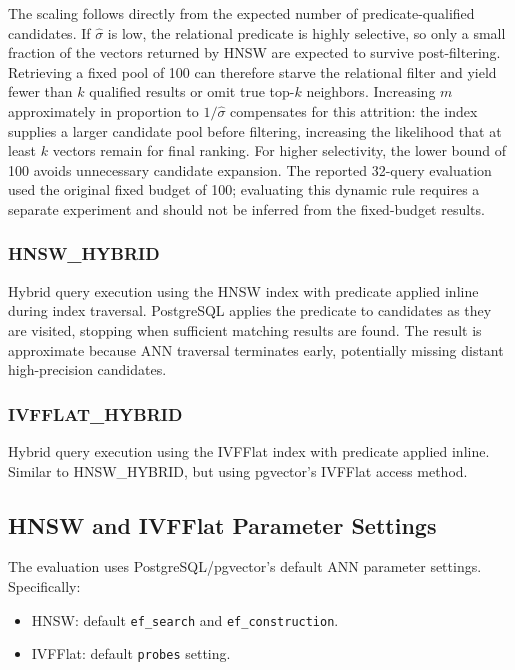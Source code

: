 \documentclass[10pt,twocolumn]{article}
\begin{document}
The scaling follows directly from the expected number of predicate-qualified candidates. If $\hat{\sigma}$ is low, the relational predicate is highly selective, so only a small fraction of the vectors returned by HNSW are expected to survive post-filtering. Retrieving a fixed pool of 100 can therefore starve the relational filter and yield fewer than $k$ qualified results or omit true top-$k$ neighbors. Increasing $m$ approximately in proportion to $1/\hat{\sigma}$ compensates for this attrition: the index supplies a larger candidate pool before filtering, increasing the likelihood that at least $k$ vectors remain for final ranking. For higher selectivity, the lower bound of 100 avoids unnecessary candidate expansion. The reported 32-query evaluation used the original fixed budget of 100; evaluating this dynamic rule requires a separate experiment and should not be inferred from the fixed-budget results.

\subsubsection{HNSW\_HYBRID}

Hybrid query execution using the HNSW index with predicate applied inline during index traversal. PostgreSQL applies the predicate to candidates as they are visited, stopping when sufficient matching results are found. The result is approximate because ANN traversal terminates early, potentially missing distant high-precision candidates.

\subsubsection{IVFFLAT\_HYBRID}

Hybrid query execution using the IVFFlat index with predicate applied inline. Similar to HNSW\_HYBRID, but using pgvector's IVFFlat access method.

\subsection{HNSW and IVFFlat Parameter Settings}

The evaluation uses PostgreSQL/pgvector's default ANN parameter settings. Specifically:
\begin{itemize}
\item HNSW: default \texttt{ef\_search} and \texttt{ef\_construction}.
\item IVFFlat: default \texttt{probes} setting.
\end{itemize}
\end{document}
